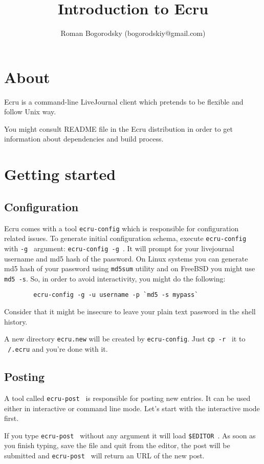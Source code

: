 \documentclass{article}
\title{Introduction to Ecru}
\author{Roman Bogorodsky (bogorodskiy@gmail.com)}
\date{}
\begin{document}
   \maketitle
   \section{About}
    Ecru is a command-line LiveJournal client which pretends to be flexible
    and follow Unix way.
 
    You might consult README file in the Ecru distribution in order to get
    information about dependencies and build process.

    \section{Getting started}
      \subsection{Configuration}
       Ecru comes with a tool {\tt ecru-config} which is responsible for
       configuration related issues. To generate initial configuration schema,
       execute {\tt ecru-config } with {\tt -g } argument: { \tt ecru-config -g }. It
       will prompt for your livejournal username and md5 hash of the password.
       On Linux systems you can generate md5 hash of your password using
       {\tt md5sum} utility and on FreeBSD you might use {\tt md5 -s}. So, in order
       to avoid interactivity, you might do the following:
  
	\begin{verbatim}
		ecru-config -g -u username -p `md5 -s mypass`
	\end{verbatim}
	
	Consider that it might be insecure to leave your plain text password in the
	shell history.

	A new directory {\tt ecru.new} will be created by {\tt ecru-config}. Just 
	{\tt cp -r } it to {\tt ~/.ecru} and you're done with it.
       \subsection{Posting}
	A tool called {\tt ecru-post } is responsible for posting new entries. It can be used
	either in interactive or command line mode. Let's start with the interactive mode first.

	If you type {\tt ecru-post } without any argument it will load {\tt \$EDITOR }. As soon as you
	finish typing, save the file and quit from the editor, the post will be submitted and
	{\tt ecru-post } will return an URL of the new post.
\end{document}
